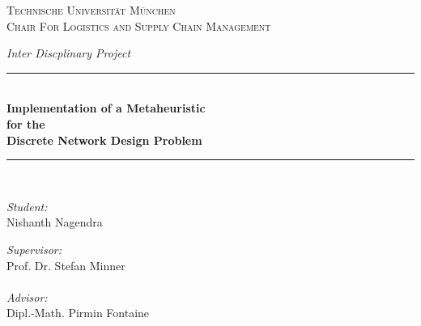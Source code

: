 \documentclass[a4paper, 12pt]{article}
\begin{document}
\begin{titlepage}

\newcommand{\HRule}{\rule{135mm}{0.5mm}} %

\center %


\textsc{\LARGE Technische Universit{\"a}t M{\"u}nchen}\\[1.5cm] %
\textsc{\Large Chair For Logistics and Supply Chain Management}\\[0.5cm] %

\vspace{35mm}
\begin{center}
\Large\textit{Inter Discplinary Project}
\end{center}
\HRule \\[0.4cm]
{ \Large \bfseries Implementation of a Metaheuristic\\for the\\Discrete Network Design Problem}\\[0.5cm] %
\HRule \\[1.5cm]

\vspace{48mm}
\begin{minipage}{0.4\textwidth}
\begin{flushleft} \large
\emph{Student:}\\
Nishanth Nagendra %
\end{flushleft}
\end{minipage}
\begin{minipage}{0.4\textwidth} 
\begin{flushright} \large
\emph{Supervisor:} \\
Prof. Dr. Stefan Minner \\~\\ %
\emph{Advisor:} \\
Dipl.-Math. Pirmin Fontaine %
\end{flushright}
\end{minipage}\\[2cm]


\end{titlepage}
\end{document}
